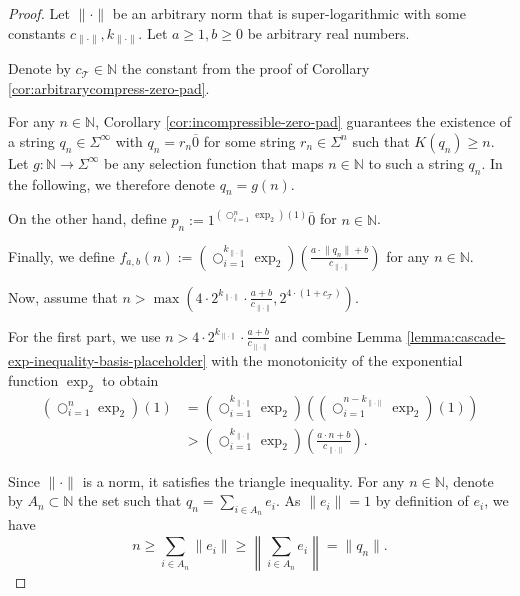 \begin{proof}
	Let $\lVert \cdot \rVert$ be an arbitrary norm that is super-logarithmic with some constants $c_{\lVert\cdot\rVert},k_{\lVert\cdot\rVert}$.
	Let $a\geq 1, b\geq 0$ be arbitrary real numbers.
	
	Denote by $c_{\mathcal{T}}\in\mathbb{N}$ the constant from the proof of Corollary \ref{cor:arbitrarycompress-zero-pad}.
	
	For any $n\in\mathbb{N}$, Corollary \ref{cor:incompressible-zero-pad} guarantees the existence of a string $q_n\in\Sigma^{\infty}$ with $q_n=r_n\overline{0}$ for some string $r_n\in\Sigma^n$ such that $K(q_n)\geq n$. 
	Let $g:\mathbb{N} \to \Sigma^{\infty}$ be any selection function that maps $n\in\mathbb{N}$ to such a string $q_n$. In the following, we therefore denote $q_n=g(n)$.
	
	On the other hand, define $p_n:=1^{\left(\bigcirc_{i=1}^n \exp_2\right)(1)}\overline{0}$ for $n\in\mathbb{N}$.
	
	Finally, we define $f_{a,b}(n):=\left(\bigcirc_{i=1}^{k_{\lVert\cdot\rVert}} \exp_2\right)\left(\frac{a\cdot \lVert q_n \rVert+b}{c_{\lVert\cdot\rVert}}\right)$ for any $n\in\mathbb{N}$.
	
	Now, assume that $n>\max \left(4\cdot 2^{k_{\lVert\cdot\rVert}}\cdot \frac{a+b}{c_{\lVert\cdot\rVert}}, 2^{4\cdot (1+c_{\mathcal{T}})}\right)$.
	
	For the first part, we use $n>4\cdot 2^{k_{\lVert\cdot\rVert}}\cdot \frac{a+b}{c_{\lVert\cdot\rVert}}$ and combine Lemma \ref{lemma:cascade-exp-inequality-basis-placeholder} with the monotonicity of the exponential function $\exp_2$ to obtain
	\begin{align}
		\label{eq:exp-f_ab-inequality-1}
		\left(\bigcirc_{i=1}^n \exp_2\right)(1) & = \left(\bigcirc_{i=1}^{k_{\lVert\cdot\rVert}} \exp_2\right)\left( \left(\bigcirc_{i=1}^{n-k_{\lVert\cdot\rVert}} \exp_2\right)(1) \right)\\
		& > \left(\bigcirc_{i=1}^{k_{\lVert\cdot\rVert}} \exp_2\right)\left( \frac{a\cdot n + b }{c_{\lVert\cdot\rVert}}\right).
	\end{align}
	
	Since $\lVert\cdot\rVert$ is a norm, it satisfies the triangle inequality.
	For any $n\in\mathbb{N}$, denote by $A_n\subset \mathbb{N}$ the set such that $q_n=\sum_{i\in A_n}e_i$.
	As $\lVert e_i \rVert = 1$ by definition of $e_i$, we have 
	\begin{equation}
		\label{eq:q_n-triangle-basis-vector-inequality}
		n\geq \sum_{i\in A_n}\lVert e_i \rVert \geq\left\lVert \sum_{i\in A_n} e_i\right\rVert = \lVert q_n \rVert.
	\end{equation}
	

\end{proof}
